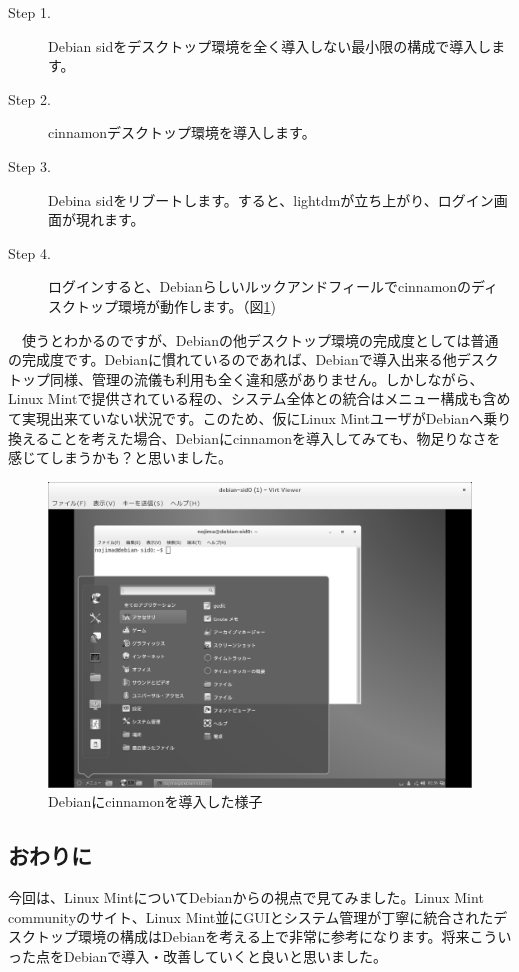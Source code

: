 \documentclass[mingoth,a4paper]{jsarticle}
\begin{document}
\begin{description}
\item [Step 1.] Debian sidをデスクトップ環境を全く導入しない最小限の構成で導入します。
\item [Step 2.] cinnamonデスクトップ環境を導入します。
\item [Step 3.] Debina sidをリブートします。すると、lightdmが立ち上がり、ログイン画面が現れます。
\item [Step 4.] ログインすると、Debianらしいルックアンドフィールでcinnamonのディスクトップ環境が動作します。（図\ref{fig:debian-cinnamon})
\end{description}

　使うとわかるのですが、Debianの他デスクトップ環境の完成度としては普通の完成度です。Debianに慣れているのであれば、Debianで導入出来る他デスクトップ同様、管理の流儀も利用も全く違和感がありません。しかしながら、Linux Mintで提供されている程の、システム全体との統合はメニュー構成も含めて実現出来ていない状況です。このため、仮にLinux MintユーザがDebianへ乗り換えることを考えた場合、Debianにcinnamonを導入してみても、物足りなさを感じてしまうかも？と思いました。

\begin{figure}[H]
\centering
\includegraphics[width=0.6\hsize]{image201412/debian-cinnamon_mono.png}  
\caption{Debianにcinnamonを導入した様子}\label{fig:debian-cinnamon}
\end{figure} 

\subsection{おわりに}

 今回は、Linux MintについてDebianからの視点で見てみました。Linux Mint communityのサイト、Linux Mint並にGUIとシステム管理が丁寧に統合されたデスクトップ環境の構成はDebianを考える上で非常に参考になります。将来こういった点をDebianで導入・改善していくと良いと思いました。
\end{document}
